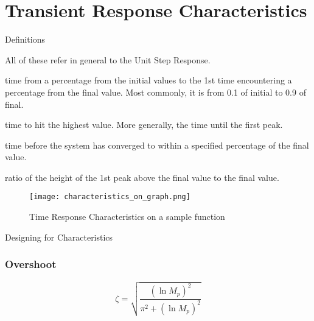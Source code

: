 \documentclass{../templates/topic}
\begin{document}
\graphicspath{{assets/}{ch3a_Time_Domain_Performance_Characteristics/assets/}}

\chapter{Transient Response Characteristics}

\begin{section}{Definitions}
	
	All of these refer in general to the Unit Step Response.
	
	  time from a percentage from the initial values to the 1st time encountering a percentage from the final value. Most commonly, it is from 0.1 of initial to 0.9 of final.
	
	  time to hit the highest value. More generally, the time until the first peak.
	
	  time before the system has converged to within a specified percentage of the final value.
	
	 ratio of the height of the 1st peak above the final value to the final value.
	
	\begin{figure}[H]
		\texttt{[image: characteristics\_on\_graph.png]}
		\caption{Time Response Characteristics on a sample function}
	\end{figure}
	
\end{section}

\begin{section}{Designing for Characteristics}
	\subsection{Overshoot}
		\begin{equation*}
			\zeta = \sqrt{\frac{(\ln{M_p})^2}{\pi^2+(\ln{M_p})^2}}
		\end{equation*}
	
\end{section}
\end{document}
